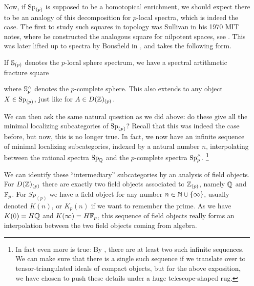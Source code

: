 Now, if $\sp_{(p)}$ is supposed to be a homotopical enrichment, we should expect there to be an analogy of this decomposition for $p$-local spectra, which is indeed the case. The first to study such squares in topology was Sullivan in his 1970 MIT notes, where he constructed the analogous square for nilpotent spaces, see \cite[3.20]{sullivan_05}. This was later lifted up to spectra by Bousfield in \cite[2.9]{bousfield_1979_localization}, and takes the following form. 

If $\S_{(p)}$ denotes the $p$-local sphere spectrum, we have a spectral artithmetic fracture square 

\begin{center}
\end{center}

where $\S_p^\wedge$ denotes the $p$-complete sphere. This also extends to any object $X\in \sp_{(p)}$, just like for $A\in D(\Z)_{(p)}$. 

We can then ask the same natural question as we did above: do these give all the minimal localizing subcategories of $\sp_{(p)}$? Recall that this was indeed the case before, but now, this is no longer true. In fact, we now have an infinite sequence of minimal localizing subcategories, indexed by a natural number $n$, interpolating between the rational spectra $\sp_{\Q}$ and the $p$-complete spectra $\sp_p^\wedge$. \footnote{In fact even more is true: By \cite{burklund-hahn-levy-schlank_23}, there are at least two such infinite sequences. We can make sure that there is a single such sequence if we translate over to tensor-triangulated ideals of compact objects, but for the above exposition, we have chosen to push these details under a huge telescope-shaped rug.}

We can identify these ``intermediary'' subcategories by an analysis of field objects. For $D(\Z)_{(p)}$ there are exactly two field objects associated to $\Z_{(p)}$, namely $\Q$ and $\F_p$. For $Sp_{(p)}$ we have a field object for any number $n\in \N\cup \{\infty\}$, usually denoted $K(n)$, or $K_p(n)$ if we want to remember the prime. As we have $K(0)=H\Q$ and $K(\infty) = H\F_p$, this sequence of field objects really forms an interpolation between the two field objects coming from algebra. 

